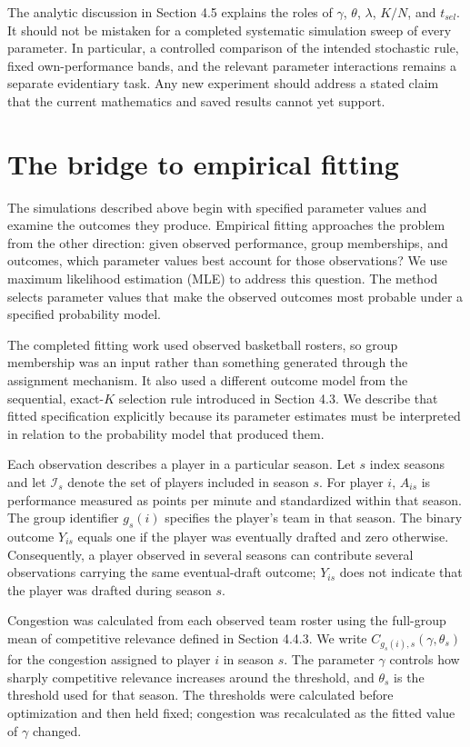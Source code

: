 The analytic discussion in Section 4.5 explains the roles of \(\gamma\), \(\theta\), \(\lambda\), \(K/N\), and \(t_{sel}\). It should not be mistaken for a completed systematic simulation sweep of every parameter. In particular, a controlled comparison of the intended stochastic rule, fixed own-performance bands, and the relevant parameter interactions remains a separate evidentiary task. Any new experiment should address a stated claim that the current mathematics and saved results cannot yet support.

\section{The bridge to empirical fitting}\label{the-bridge-to-empirical-fitting}

The simulations described above begin with specified parameter values and examine the outcomes they produce. Empirical fitting approaches the problem from the other direction: given observed performance, group memberships, and outcomes, which parameter values best account for those observations? We use maximum likelihood estimation (MLE) to address this question. The method selects parameter values that make the observed outcomes most probable under a specified probability model.

The completed fitting work used observed basketball rosters, so group membership was an input rather than something generated through the assignment mechanism. It also used a different outcome model from the sequential, exact-\(K\) selection rule introduced in Section 4.3. We describe that fitted specification explicitly because its parameter estimates must be interpreted in relation to the probability model that produced them.

Each observation describes a player in a particular season. Let \(s\) index seasons and let \(\mathcal I_s\) denote the set of players included in season \(s\). For player \(i\), \(A_{is}\) is performance measured as points per minute and standardized within that season. The group identifier \(g_s(i)\) specifies the player's team in that season. The binary outcome \(Y_{is}\) equals one if the player was eventually drafted and zero otherwise. Consequently, a player observed in several seasons can contribute several observations carrying the same eventual-draft outcome; \(Y_{is}\) does not indicate that the player was drafted during season \(s\).

Congestion was calculated from each observed team roster using the full-group mean of competitive relevance defined in Section 4.4.3. We write \(C_{g_s(i),s}(\gamma,\theta_s)\) for the congestion assigned to player \(i\) in season \(s\). The parameter \(\gamma\) controls how sharply competitive relevance increases around the threshold, and \(\theta_s\) is the threshold used for that season. The thresholds were calculated before optimization and then held fixed; congestion was recalculated as the fitted value of \(\gamma\) changed.


